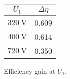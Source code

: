 
\begin{solutiontable}[ht]
    \centering  %
    \begin{tabular}{ll}
        \toprule
        \multicolumn{1}{c}{$U_\mathrm{1}$} & \multicolumn{1}{c}{$\Delta\eta$} \\
        \midrule 
        $\SI{320}{\volt}$ & 0.609 \\ 
        $\SI{400}{\volt}$ & 0.614  \\ 
        $\SI{720}{\volt}$ & 0.350 \\ 
        \bottomrule
    \end{tabular}
    \caption{Efficiency gain at $U_\mathrm{1}$.}
    \label{table:EfficiencyGain}
\end{solutiontable}

